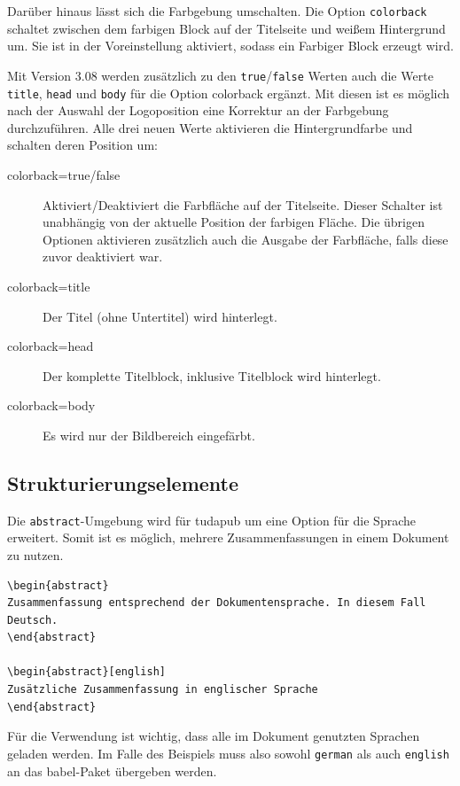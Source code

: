 \documentclass[
	ngerman,%
	accentcolor=9c,%
]{tudapub}
\newcommand*{\code}[1]{\texttt{#1}}
\newcommand*{\pkg}[1]{\textsf{#1}}
\newcommand*{\cls}[1]{\textsf{#1}}
\begin{document}
Darüber hinaus lässt sich die Farbgebung umschalten.
Die Option \code{colorback} schaltet zwischen dem farbigen Block auf der Titelseite und weißem Hintergrund um. Sie ist in der Voreinstellung aktiviert, sodass ein Farbiger Block erzeugt wird.

Mit Version 3.08 werden zusätzlich zu den \code{true}/\code{false} Werten auch die Werte \code{title}, \code{head} und \code{body} für die Option colorback ergänzt.
Mit diesen ist es möglich nach der Auswahl der Logoposition eine Korrektur an der Farbgebung durchzuführen. Alle drei neuen Werte aktivieren die Hintergrundfarbe und schalten deren Position um:
\begin{description}
	\item[colorback=true/false] Aktiviert/Deaktiviert die Farbfläche auf der Titelseite. Dieser Schalter ist unabhängig von der aktuelle Position der farbigen Fläche. Die übrigen Optionen aktivieren zusätzlich auch die Ausgabe der Farbfläche, falls diese zuvor deaktiviert war.
	\item[colorback=title] Der Titel (ohne Untertitel) wird hinterlegt.
	\item[colorback=head] Der komplette Titelblock, inklusive Titelblock wird hinterlegt.
	\item[colorback=body] Es wird nur der Bildbereich eingefärbt.
\end{description}

\subsection{Strukturierungselemente}
Die \code{abstract}-Umgebung wird für \cls{tudapub} um eine Option für die Sprache erweitert. Somit ist es möglich, mehrere Zusammenfassungen in einem Dokument zu nutzen.

\begin{verbatim}
\begin{abstract}
Zusammenfassung entsprechend der Dokumentensprache. In diesem Fall Deutsch.
\end{abstract}

\begin{abstract}[english]
Zusätzliche Zusammenfassung in englischer Sprache
\end{abstract}
\end{verbatim}

Für die Verwendung ist wichtig, dass alle im Dokument genutzten Sprachen geladen werden. Im Falle des Beispiels muss also sowohl \code{german} als auch \code{english} an das \pkg{babel}-Paket übergeben werden.
\end{document}
